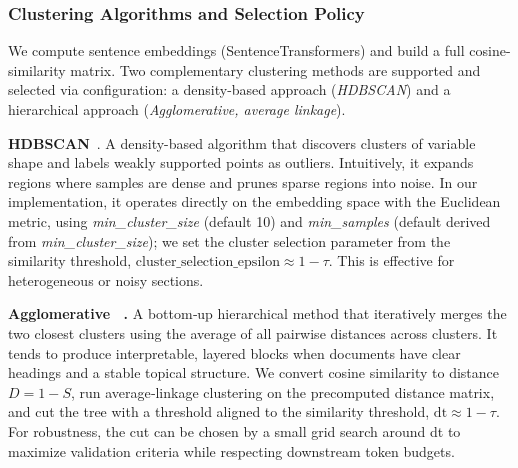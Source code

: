 \documentclass[10pt,twocolumn,letterpaper]{article}
\begin{document}
\subsubsection{Clustering Algorithms and Selection Policy}

We compute sentence embeddings (SentenceTransformers) and build a full cosine-similarity matrix. Two complementary clustering methods are supported and selected via configuration: a density-based approach (\textit{HDBSCAN}) and a hierarchical approach (\textit{Agglomerative, average linkage}).

\vspace{0.5em}
\textbf{HDBSCAN}~\cite{mcinnes2017hdbscan}. A density-based algorithm that discovers clusters of variable shape and labels weakly supported points as outliers. Intuitively, it expands regions where samples are dense and prunes sparse regions into noise. In our implementation, it operates directly on the embedding space with the Euclidean metric, using \emph{min\_cluster\_size} (default 10) and \emph{min\_samples} (default derived from \emph{min\_cluster\_size}); we set the cluster selection parameter from the similarity threshold, $\text{cluster\_selection\_epsilon} \approx 1{-}\tau$. This is effective for heterogeneous or noisy sections.

\vspace{0.5em}
\textbf{Agglomerative ~\cite{Moseley2023ApproxBounds}.} A bottom‑up hierarchical method that iteratively merges the two closest clusters using the average of all pairwise distances across clusters. It tends to produce interpretable, layered blocks when documents have clear headings and a stable topical structure. We convert cosine similarity to distance $D{=}1{-}S$, run average‑linkage clustering on the precomputed distance matrix, and cut the tree with a threshold aligned to the similarity threshold, $\text{dt}\approx 1{-}\tau$. For robustness, the cut can be chosen by a small grid search around dt to maximize validation criteria while respecting downstream token budgets.
\end{document}

